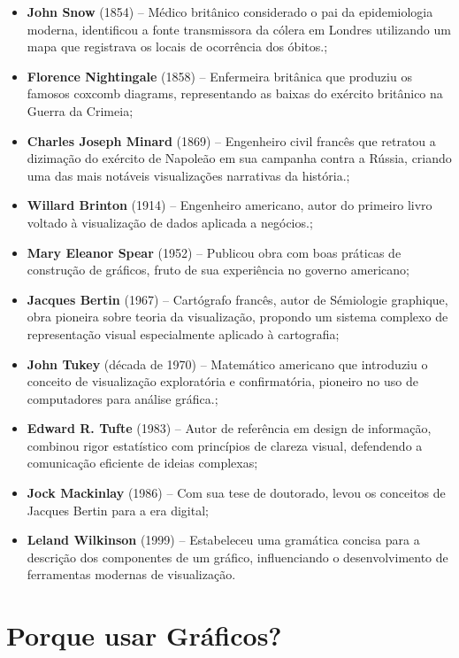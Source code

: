 \begin{itemize}
\item \textbf{John Snow} (1854) – Médico britânico considerado o pai da epidemiologia moderna, identificou a fonte transmissora da cólera em Londres utilizando um mapa que registrava os locais de ocorrência dos óbitos.;
\item \textbf{Florence Nightingale} (1858) – Enfermeira britânica que produziu os famosos coxcomb diagrams, representando as baixas do exército britânico na Guerra da Crimeia;
\item \textbf{Charles Joseph Minard} (1869) – Engenheiro civil francês que retratou a dizimação do exército de Napoleão em sua campanha contra a Rússia, criando uma das mais notáveis visualizações narrativas da história.;
\item \textbf{Willard Brinton} (1914) – Engenheiro americano, autor do primeiro livro voltado à visualização de dados aplicada a negócios.;
\item \textbf{Mary Eleanor Spear} (1952) – Publicou obra com boas práticas de construção de gráficos, fruto de sua experiência no governo americano;
\item \textbf{Jacques Bertin} (1967) – Cartógrafo francês, autor de Sémiologie graphique, obra pioneira sobre teoria da visualização, propondo um sistema complexo de representação visual especialmente aplicado à cartografia;
\item \textbf{John Tukey} (década de 1970) – Matemático americano que introduziu o conceito de visualização exploratória e confirmatória, pioneiro no uso de computadores para análise gráfica.;
\item \textbf{Edward R. Tufte} (1983) – Autor de referência em design de informação, combinou rigor estatístico com princípios de clareza visual, defendendo a comunicação eficiente de ideias complexas;
\item \textbf{Jock Mackinlay} (1986) – Com sua tese de doutorado, levou os conceitos de Jacques Bertin para a era digital;
\item \textbf{Leland Wilkinson} (1999) – Estabeleceu uma gramática concisa para a descrição dos componentes de um gráfico, influenciando o desenvolvimento de ferramentas modernas de visualização.
\end{itemize}

\section{Porque usar Gráficos?}

